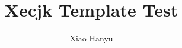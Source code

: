 \documentclass[a4paper, 12pt, titlepage]{article}
\begin{document}
\setlength{\parindent}{2em}                    

\title{Xecjk Template Test}
\author{Xiao Hanyu}
\maketitle

\tableofcontents
\listoffigures
\listoftables





\end{document}
